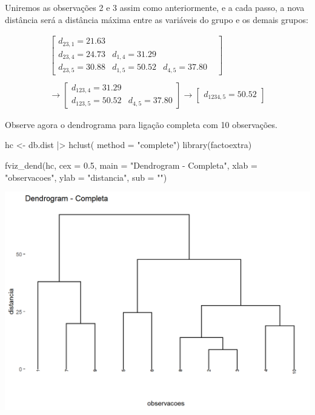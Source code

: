 \documentclass[
  letterpaper,
  DIV=11,
  numbers=noendperiod]{scrreprt}
\newenvironment{Shaded}{\begin{snugshade}}{\end{snugshade}}
\newcommand{\AttributeTok}[1]{\textcolor[rgb]{0.40,0.45,0.13}{#1}}
\newcommand{\FloatTok}[1]{\textcolor[rgb]{0.68,0.00,0.00}{#1}}
\newcommand{\FunctionTok}[1]{\textcolor[rgb]{0.28,0.35,0.67}{#1}}
\newcommand{\NormalTok}[1]{\textcolor[rgb]{0.00,0.23,0.31}{#1}}
\newcommand{\OtherTok}[1]{\textcolor[rgb]{0.00,0.23,0.31}{#1}}
\newcommand{\SpecialCharTok}[1]{\textcolor[rgb]{0.37,0.37,0.37}{#1}}
\newcommand{\StringTok}[1]{\textcolor[rgb]{0.13,0.47,0.30}{#1}}
\begin{document}
Uniremos as observações 2 e 3 assim como anteriormente, e a cada passo,
a nova distância será a distância máxima entre as variáveis do grupo e
os demais grupos:

\[
\begin{split}
\begin{bmatrix}
d_{23,1}=21.63 &  & & \\
d_{23,4}= 24.73 & d_{1,4}=31.29 & & \\
d_{23,5}=30.88 & d_{1,5}=50.52 & d_{4,5}=37.80 
\end{bmatrix}\\
\\
\rightarrow
\begin{bmatrix}
d_{123,4}=31.29 \\
d_{123,5}= 50.52 & d_{4,5} = 37.80
\end{bmatrix} \rightarrow
\begin{bmatrix}
d_{1234,5}=50.52
\end{bmatrix}
\end{split}
\]

Observe agora o dendrograma para ligação completa com 10 observações.

\begin{Shaded}
\begin{Highlighting}[]
\NormalTok{hc }\OtherTok{\textless{}{-}}\NormalTok{  db.dist }\SpecialCharTok{|\textgreater{}} 
  \FunctionTok{hclust}\NormalTok{( }\AttributeTok{method =} \StringTok{"complete"}\NormalTok{) }
\FunctionTok{library}\NormalTok{(factoextra)}
\end{Highlighting}
\end{Shaded}

\begin{Shaded}
\begin{Highlighting}[]
\FunctionTok{fviz\_dend}\NormalTok{(hc, }\AttributeTok{cex =} \FloatTok{0.5}\NormalTok{,}
          \AttributeTok{main =} \StringTok{"Dendrogram {-} Completa"}\NormalTok{,}
          \AttributeTok{xlab =} \StringTok{"observacoes"}\NormalTok{, }\AttributeTok{ylab =} \StringTok{"distancia"}\NormalTok{, }\AttributeTok{sub =} \StringTok{""}\NormalTok{)}
\end{Highlighting}
\end{Shaded}

\includegraphics{./figuras_naosupervisionado/unnamed-chunk-8-1.png}
\end{document}
